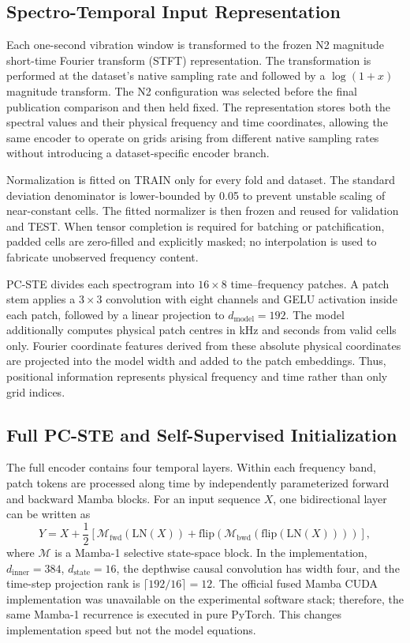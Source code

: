 \subsection{Spectro-Temporal Input Representation}
\label{subsec:representation}

Each one-second vibration window is transformed to the frozen N2 magnitude short-time Fourier transform (STFT) representation. The transformation is performed at the dataset's native sampling rate and followed by a $\log(1+x)$ magnitude transform. The N2 configuration was selected before the final publication comparison and then held fixed. The representation stores both the spectral values and their physical frequency and time coordinates, allowing the same encoder to operate on grids arising from different native sampling rates without introducing a dataset-specific encoder branch.

Normalization is fitted on TRAIN only for every fold and dataset. The standard deviation denominator is lower-bounded by 0.05 to prevent unstable scaling of near-constant cells. The fitted normalizer is then frozen and reused for validation and TEST. When tensor completion is required for batching or patchification, padded cells are zero-filled and explicitly masked; no interpolation is used to fabricate unobserved frequency content.

PC-STE divides each spectrogram into $16\times8$ time--frequency patches. A patch stem applies a $3\times3$ convolution with eight channels and GELU activation inside each patch, followed by a linear projection to $d_{\mathrm{model}}=192$. The model additionally computes physical patch centres in kHz and seconds from valid cells only. Fourier coordinate features derived from these absolute physical coordinates are projected into the model width and added to the patch embeddings. Thus, positional information represents physical frequency and time rather than only grid indices.

\subsection{Full PC-STE and Self-Supervised Initialization}
\label{subsec:fullpcste}

The full encoder contains four temporal layers. Within each frequency band, patch tokens are processed along time by independently parameterized forward and backward Mamba blocks. For an input sequence $X$, one bidirectional layer can be written as
\begin{equation}
    Y = X + \frac{1}{2}\left[
    \mathcal{M}_{\mathrm{fwd}}(\mathrm{LN}(X)) +
    \mathrm{flip}\left(\mathcal{M}_{\mathrm{bwd}}(\mathrm{flip}(\mathrm{LN}(X)))\right)
    \right],
\end{equation}
where $\mathcal{M}$ is a Mamba-1 selective state-space block. In the implementation, $d_{\mathrm{inner}}=384$, $d_{\mathrm{state}}=16$, the depthwise causal convolution has width four, and the time-step projection rank is $\lceil192/16\rceil=12$. The official fused Mamba CUDA implementation was unavailable on the experimental software stack; therefore, the same Mamba-1 recurrence is executed in pure PyTorch. This changes implementation speed but not the model equations.

